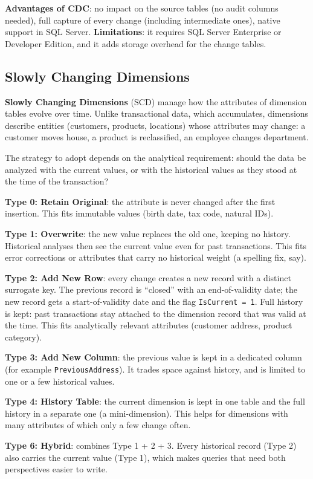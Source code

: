 \begin{notebox}
\textbf{Advantages of CDC}: no impact on the source tables (no audit columns needed), full capture of every change (including intermediate ones), native support in SQL Server. \textbf{Limitations}: it requires SQL Server Enterprise or Developer Edition, and it adds storage overhead for the change tables.
\end{notebox}

\subsection{Slowly Changing Dimensions}
\label{sec:scd}

\textbf{Slowly Changing Dimensions} (SCD) manage how the attributes of dimension tables evolve over time. Unlike transactional data, which accumulates, dimensions describe entities (customers, products, locations) whose attributes may change: a customer moves house, a product is reclassified, an employee changes department.

The strategy to adopt depends on the analytical requirement: should the data be analyzed with the current values, or with the historical values as they stood at the time of the transaction?

\begin{theorybox}[frametitle={SCD types}]
\textbf{Type 0: Retain Original}: the attribute is never changed after the first insertion. This fits immutable values (birth date, tax code, natural IDs).

\textbf{Type 1: Overwrite}: the new value replaces the old one, keeping no history. Historical analyses then see the current value even for past transactions. This fits error corrections or attributes that carry no historical weight (a spelling fix, say).

\textbf{Type 2: Add New Row}: every change creates a new record with a distinct surrogate key. The previous record is ``closed'' with an end-of-validity date; the new record gets a start-of-validity date and the flag \texttt{IsCurrent = 1}. Full history is kept: past transactions stay attached to the dimension record that was valid at the time. This fits analytically relevant attributes (customer address, product category).

\textbf{Type 3: Add New Column}: the previous value is kept in a dedicated column (for example \texttt{PreviousAddress}). It trades space against history, and is limited to one or a few historical values.

\textbf{Type 4: History Table}: the current dimension is kept in one table and the full history in a separate one (a mini-dimension). This helps for dimensions with many attributes of which only a few change often.

\textbf{Type 6: Hybrid}: combines Type 1 + 2 + 3. Every historical record (Type 2) also carries the current value (Type 1), which makes queries that need both perspectives easier to write.
\end{theorybox}

